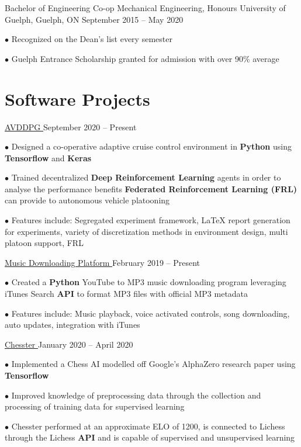 \documentclass[a4paper,11pt]{article}
\newcommand{\github}{cboin1996} %
\newcommand{\sectionsep}{\vspace{-2.5mm}}
\begin{document}
\resumeEdu
{Bachelor of Engineering Co-op Mechanical Engineering, Honours }
{University of Guelph, Guelph, ON}
{September 2015 -- May 2020}
{}

\resumeItemListStart
\item[$\bullet$] Recognized on the Dean's list every semester
\item[$\bullet$] Guelph Entrance Scholarship granted for admission with over 90\% average
\resumeItemListEnd
\resumeSubHeadingListEnd
\sectionsep

\section{Software Projects}
\resumeSubHeadingListStart

\resumeProject
{\href{https://github.com/\github/avddpg}{AVDDPG \footnotesize{\faExternalLink}}}
{September 2020 -- Present} %
\resumeItemListStart
\item[$\bullet$] Designed a co-operative adaptive cruise control environment in \textbf{Python} using \textbf{Tensorflow} and
\textbf{Keras}
\item[$\bullet$] Trained decentralized \textbf{Deep Reinforcement Learning} agents in order to analyse the performance benefits \textbf{Federated Reinforcement Learning (FRL)}
can provide to autonomous vehicle platooning
\item[$\bullet$] Features include: Segregated experiment framework, \LaTeX \hspace{0.5pt} report generation for experiments,
variety of discretization methods in environment design, multi platoon support, FRL
\resumeItemListEnd

\resumeProject
{\href{https://github.com/cboin1996/JukeBox}{Music Downloading Platform \footnotesize{\faExternalLink}}} %
{February 2019 -- Present} %
\resumeItemListStart
\item[$\bullet$] Created a \textbf{Python} YouTube to MP3 music downloading program leveraging iTunes Search \textbf{API} to format
MP3 files with official MP3 metadata
\item[$\bullet$] Features include: Music playback, voice activated controls, song downloading, auto updates,
integration with iTunes
\resumeItemListEnd

\resumeProject
{\href{https://github.com/cboin1996/Chesster}{Chesster \footnotesize{\faExternalLink}}} %
{January 2020 -- April 2020} %
\resumeItemListStart
\item[$\bullet$] Implemented a Chess AI modelled off Google's AlphaZero research paper using \textbf{Tensorflow}
\item[$\bullet$] Improved knowledge of preprocessing data through the collection and processing of training data
for supervised learning
\item[$\bullet$] Chesster performed at an approximate ELO of 1200, is connected to Lichess through the
Lichess \textbf{API} and is capable of supervised and unsupervised learning
\resumeItemListEnd
\end{document}
